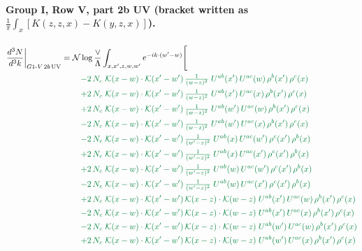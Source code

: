 \documentclass[10pt]{article}
\numberwithin{equation}{section}
\newcommand{\NN}{\mathcal N\log\frac{\vee}{\Lambda}}
\begin{document}
\paragraph{Group I, Row V, part 2b UV (bracket written as $\frac1\pi\int_x[K(z,z,x)-K(y,z,x)]$).}
\begin{align}
\frac{d^3N}{d^3k}\bigg|_{G1\text{-}V\,2b\,{\rm UV}}={}&\NN\int_{x,x',z,w,w'}e^{-ik\cdot(w'-w)}\Bigg[\notag\\
&\quad{\color{JIM}-2\,N_c\;\mathcal{K}(x-w)\cdot\mathcal{K}(x'-w')\,\tfrac{1}{(w-z)^{2}}\;U^{ab}(x')\,U^{ac}(w)\,\rho^{b}(x')\,\rho^{c}(x)}\notag\\
&\quad{\color{JIM}+2\,N_c\;\mathcal{K}(x-w)\cdot\mathcal{K}(x'-w')\,\tfrac{1}{(w-z)^{2}}\;U^{ab}(x')\,U^{ac}(x)\,\rho^{b}(x')\,\rho^{c}(x)}\notag\\
&\quad{\color{JIM}+2\,N_c\;\mathcal{K}(x-w)\cdot\mathcal{K}(x'-w')\,\tfrac{1}{(w-z)^{2}}\;U^{ab}(w')\,U^{ac}(w)\,\rho^{b}(x')\,\rho^{c}(x)}\notag\\
&\quad{\color{JIM}-2\,N_c\;\mathcal{K}(x-w)\cdot\mathcal{K}(x'-w')\,\tfrac{1}{(w-z)^{2}}\;U^{ab}(w')\,U^{ac}(x)\,\rho^{b}(x')\,\rho^{c}(x)}\notag\\
&\quad{\color{JIM}-2\,N_c\;\mathcal{K}(x-w)\cdot\mathcal{K}(x'-w')\,\tfrac{1}{(w'-z)^{2}}\;U^{ab}(x)\,U^{ac}(w')\,\rho^{c}(x')\,\rho^{b}(x)}\notag\\
&\quad{\color{JIM}+2\,N_c\;\mathcal{K}(x-w)\cdot\mathcal{K}(x'-w')\,\tfrac{1}{(w'-z)^{2}}\;U^{ab}(x)\,U^{ac}(x')\,\rho^{c}(x')\,\rho^{b}(x)}\notag\\
&\quad{\color{JIM}+2\,N_c\;\mathcal{K}(x-w)\cdot\mathcal{K}(x'-w')\,\tfrac{1}{(w'-z)^{2}}\;U^{ab}(w)\,U^{ac}(w')\,\rho^{c}(x')\,\rho^{b}(x)}\notag\\
&\quad{\color{JIM}-2\,N_c\;\mathcal{K}(x-w)\cdot\mathcal{K}(x'-w')\,\tfrac{1}{(w'-z)^{2}}\;U^{ab}(w)\,U^{ac}(x')\,\rho^{c}(x')\,\rho^{b}(x)}\notag\\
&\quad{\color{JIM}+2\,N_c\;\mathcal{K}(x-w)\cdot\mathcal{K}(x'-w')\,\mathcal{K}(x-z)\cdot\mathcal{K}(w-z)\;U^{ab}(x')\,U^{ac}(w)\,\rho^{b}(x')\,\rho^{c}(x)}\notag\\
&\quad{\color{JIM}-2\,N_c\;\mathcal{K}(x-w)\cdot\mathcal{K}(x'-w')\,\mathcal{K}(x-z)\cdot\mathcal{K}(w-z)\;U^{ab}(x')\,U^{ac}(x)\,\rho^{b}(x')\,\rho^{c}(x)}\notag\\
&\quad{\color{JIM}-2\,N_c\;\mathcal{K}(x-w)\cdot\mathcal{K}(x'-w')\,\mathcal{K}(x-z)\cdot\mathcal{K}(w-z)\;U^{ab}(w')\,U^{ac}(w)\,\rho^{b}(x')\,\rho^{c}(x)}\notag\\
&\quad{\color{JIM}+2\,N_c\;\mathcal{K}(x-w)\cdot\mathcal{K}(x'-w')\,\mathcal{K}(x-z)\cdot\mathcal{K}(w-z)\;U^{ab}(w')\,U^{ac}(x)\,\rho^{b}(x')\,\rho^{c}(x)}\notag\\

\end{align}
\end{document}

